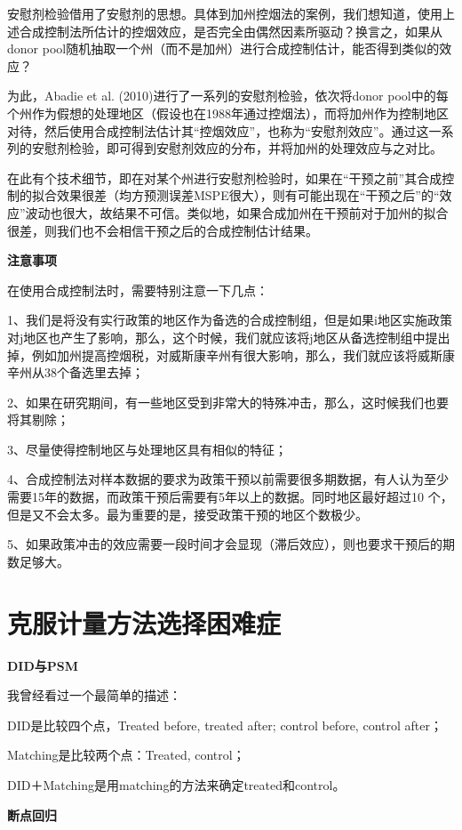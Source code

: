 \documentclass[cn,12pt,math=newtx,citestyle=gb7714-2015,bibstyle=gb7714-2015]{elegantbook}
\begin{document}
	安慰剂检验借用了安慰剂的思想。具体到加州控烟法的案例，我们想知道，使用上述合成控制法所估计的控烟效应，是否完全由偶然因素所驱动？换言之，如果从donor pool随机抽取一个州（而不是加州）进行合成控制估计，能否得到类似的效应？
	
	为此，Abadie et al. (2010)进行了一系列的安慰剂检验，依次将donor pool中的每个州作为假想的处理地区（假设也在1988年通过控烟法），而将加州作为控制地区对待，然后使用合成控制法估计其“控烟效应”，也称为“安慰剂效应”。通过这一系列的安慰剂检验，即可得到安慰剂效应的分布，并将加州的处理效应与之对比。
	
	在此有个技术细节，即在对某个州进行安慰剂检验时，如果在“干预之前”其合成控制的拟合效果很差（均方预测误差MSPE很大），则有可能出现在“干预之后”的“效应”波动也很大，故结果不可信。类似地，如果合成加州在干预前对于加州的拟合很差，则我们也不会相信干预之后的合成控制估计结果。
	
	\textbf{注意事项}
	
	在使用合成控制法时，需要特别注意一下几点：
	
	1、我们是将没有实行政策的地区作为备选的合成控制组，但是如果i地区实施政策对j地区也产生了影响，那么，这个时候，我们就应该将j地区从备选控制组中提出掉，例如加州提高控烟税，对威斯康辛州有很大影响，那么，我们就应该将威斯康辛州从38个备选里去掉；
	
	2、如果在研究期间，有一些地区受到非常大的特殊冲击，那么，这时候我们也要将其剔除；
	
	3、尽量使得控制地区与处理地区具有相似的特征；
	
	4、合成控制法对样本数据的要求为政策干预以前需要很多期数据，有人认为至少需要15年的数据，而政策干预后需要有5年以上的数据。同时地区最好超过10 个，但是又不会太多。最为重要的是，接受政策干预的地区个数极少。
	
	5、如果政策冲击的效应需要一段时间才会显现（滞后效应），则也要求干预后的期数足够大。
	
	\section{克服计量方法选择困难症}
	\textbf{DID与PSM}
	
	我曾经看过一个最简单的描述：
	
	DID是比较四个点，Treated before, treated after; control before, control after；
	
	Matching是比较两个点：Treated, control；
	
	DID＋Matching是用matching的方法来确定treated和control。
	
	
	\textbf{断点回归}
	
\end{document}
